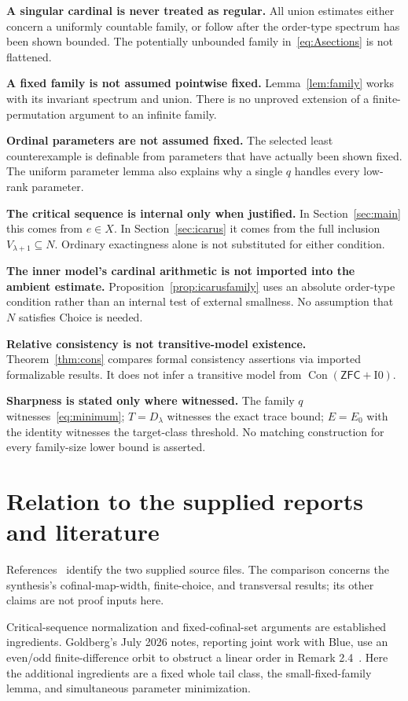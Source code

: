 \documentclass[11pt,letterpaper]{article}
\theoremstyle{definition}
\numberwithin{equation}{section}
\newcommand{\ZFC}{\mathsf{ZFC}}
\newcommand{\Con}{\operatorname{Con}}
\newcommand{\Izero}{\mathrm{I0}}
\newcommand{\D}{D_\lambda}
\begin{document}
\textbf{A singular cardinal is never treated as regular.} All union estimates either concern a uniformly countable family, or follow after the order-type spectrum has been shown bounded. The potentially unbounded family in~\eqref{eq:Asections} is not flattened.

\textbf{A fixed family is not assumed pointwise fixed.} Lemma~\ref{lem:family} works with its invariant spectrum and union. There is no unproved extension of a finite-permutation argument to an infinite family.

\textbf{Ordinal parameters are not assumed fixed.} The selected least counterexample is definable from parameters that have actually been shown fixed. The uniform parameter lemma also explains why a single $q$ handles every low-rank parameter.

\textbf{The critical sequence is internal only when justified.} In Section~\ref{sec:main} this comes from $e\in X$. In Section~\ref{sec:icarus} it comes from the full inclusion $V_{\lambda+1}\subseteq N$. Ordinary exactingness alone is not substituted for either condition.

\textbf{The inner model's cardinal arithmetic is not imported into the ambient estimate.} Proposition~\ref{prop:icarusfamily} uses an absolute order-type condition rather than an internal test of external smallness. No assumption that $N$ satisfies Choice is needed.

\textbf{Relative consistency is not transitive-model existence.} Theorem~\ref{thm:cons} compares formal consistency assertions via imported formalizable results. It does not infer a transitive model from $\Con(\ZFC+\Izero)$.

\textbf{Sharpness is stated only where witnessed.} The family $q$ witnesses~\eqref{eq:minimum}; $T=\D$ witnesses the exact trace bound; $E=E_0$ with the identity witnesses the target-class threshold. No matching construction for every family-size lower bound is asserted.

\section{Relation to the supplied reports and literature}\label{app:sources}

References~\cite{plan,synthesis} identify the two supplied source files. The comparison concerns the synthesis's cofinal-map-width, finite-choice, and transversal results; its other claims are not proof inputs here.

Critical-sequence normalization and fixed-cofinal-set arguments are established ingredients. Goldberg's July 2026 notes, reporting joint work with Blue, use an even/odd finite-difference orbit to obstruct a linear order in Remark 2.4~\cite{BG}. Here the additional ingredients are a fixed whole tail class, the small-fixed-family lemma, and simultaneous parameter minimization.
\end{document}
